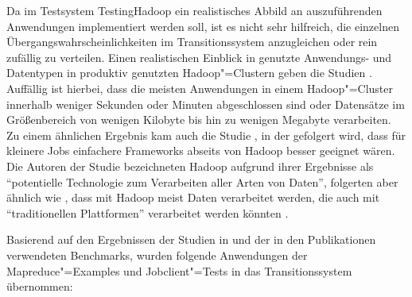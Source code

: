 Da im Testsystem TestingHadoop ein realistisches Abbild an auszuführenden Anwendungen implementiert werden soll, ist es nicht sehr hilfreich, die einzelnen Übergangswahrscheinlichkeiten im Transitionssystem anzugleichen oder rein zufällig zu verteilen.
Einen realistischen Einblick in genutzte Anwendungs- und Datentypen in produktiv genutzten Hadoop"=Clustern geben \uA die Studien \cite{Chen2012,HadoopDataTypes}.
Auffällig ist hierbei, dass die meisten Anwendungen in einem Hadoop"=Cluster innerhalb weniger Sekunden oder Minuten abgeschlossen sind oder Datensätze im Größenbereich von wenigen Kilobyte bis hin zu wenigen Megabyte verarbeiten.
Zu einem ähnlichen Ergebnis kam auch die Studie \cite{Ren2013}, in der gefolgert wird, dass für kleinere Jobs einfachere Frameworks abseits von Hadoop besser geeignet wären.
Die Autoren der Studie \cite{HadoopDataTypes} bezeichneten Hadoop aufgrund ihrer Ergebnisse als \enquote{potentielle Technologie zum Verarbeiten aller Arten von Daten}, folgerten aber ähnlich wie \citeauthor{Ren2013}, dass mit Hadoop meist Daten verarbeitet werden, die auch mit \enquote{traditionellen Plattformen} verarbeitet werden könnten \cite{Ren2013}.

Basierend auf den Ergebnissen der Studien in \cite{Huang2010,Chen2012,HadoopDataTypes,Ren2013} und der in den Publikationen \cite{Shvachko2010,Dean2004,Graves2013} verwendeten Benchmarks, wurden folgende Anwendungen der Mapreduce"=Examples und Jobclient"=Tests in das Transitionssystem übernommen:

